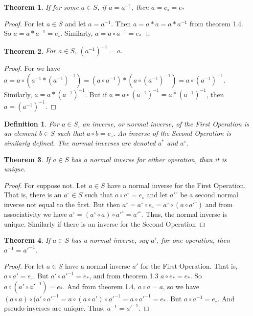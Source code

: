 \documentclass[oneside]{book}
\theoremstyle{mystyle}
\newtheorem{theorem}{Theorem}[section]
\newtheorem{definition}{Definition}[section]
\begin{document}
\begin{theorem} If for some $a\in S$, if $a=a^{-1}$, then $a=e_{\circ}=e_{*}$
\end{theorem}
\begin{proof} For let $a\in S$ and let $a=a^{-1}$. Then $a=a*a=a*a^{-1}$ from theorem 1.4. So $a=a*a^{-1}=e_{\circ}$. Similarly, $a=a\circ a^{-1} = e_{*}$
\end{proof}
\begin{theorem} For $a\in S$, $(a^{-1})^{-1} =a$.
\end{theorem}
\begin{proof} For we have $a = a\circ (a^{-1}* (a^{-1})^{-1}) = (a\circ a^{-1})*(a\circ (a^{-1})^{-1}) =a \circ (a^{-1})^{-1}$. Similarly, $a = a* (a^{-1})^{-1}$. But if $a = a\circ (a^{-1})^{-1} = a*(a^{-1})^{-1}$, then $a = (a^{-1})^{-1}$.
\end{proof}
\begin{definition} For $a\in S$, an inverse, or normal inverse, of the First Operation is an element $b\in S$ such that $a\circ b=e_{\circ}$. An inverse of the Second Operation is similarly defined. The normal inverses are denoted $a^{*}$ and $a^{\circ}$.
\end{definition}
\begin{theorem} If $a\in S$ has a normal inverse for either operation, than it is unique.
\end{theorem}
\begin{proof} For suppose not. Let $a\in S$ have a normal inverse for the First Operation. That is, there is an $a^{\circ}\in S$ such that $a\circ a^{\circ}=e_{\circ}$ and let $a'^{\circ}$ be a second normal inverse not equal to the first. But then $a^{\circ}=a^{\circ}\circ e_{\circ}=a^{\circ}\circ (a\circ a'^{\circ})$ and from associativity we have $a^{\circ}=(a^{\circ}\circ a)\circ a'^{\circ}=a'^{\circ}$. Thus, the normal inverse is unique. Similarly if there is an inverse for the Second Operation
\end{proof}
\begin{theorem} If $a\in S$ has a normal inverse, say $a'$, for one operation, then $a^{-1}=a'^{-1}$.
\end{theorem}
\begin{proof} For let $a\in S$ have a normal inverse $a'$ for the First Operation. That is, $a\circ a' = e_{\circ}$. But $a' \circ a'^{-1}=e_{*}$, and from theorem 1.3 $a\circ e_{*}=e_{*}$. So $a\circ (a' \circ a'^{-1})=e_{*}$. And from theorem 1.4, $a\circ a=a$, so we have $(a\circ a)\circ (a'\circ a'^{-1}=a\circ (a\circ a')\circ a'^{-1}=a\circ a'^{-1}=e_{*}$. But $a\circ a^{-1}=e_{\circ}$. And pseudo-inverses are unique. Thus, $a^{-1}=a'^{-1}$. 
\end{proof}
\end{document}
